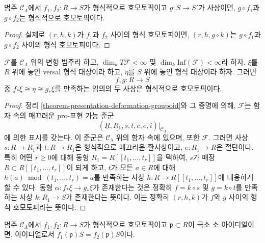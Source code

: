 \begin{lemma}
\label{lemma-composition-homotopic}
범주 $\widehat{\mathcal{C}}_\Lambda$에서 $f_1, f_2 : R \to S$가
형식적으로 호모토픽이고 $g : S \to S'$가 사상이면,
$g \circ f_1$과 $g \circ f_2$는 형식적으로 호모토픽이다.
\end{lemma}

\begin{proof}
실제로 $(r, h, k)$가 $f_1$과 $f_2$ 사이의 형식 호모토피이면,
$(r, h, g \circ k)$는 $g \circ f_1$과 $g \circ f_2$ 사이의
형식 호모토피이다.
\end{proof}

\begin{lemma}
\label{lemma-versal-unique-up-to-homotopy}
$\mathcal{F}$를 $\mathcal{C}_\Lambda$ 위의 변형 범주라 하고,
$\dim_k T\mathcal{F} < \infty$ 및
$\dim_k \text{Inf}(\mathcal{F}) < \infty$라 하자.
$\xi$를 $R$ 위에 놓인 versal 형식 대상이라 하고,
$\eta$를 $S$ 위에 놓인 형식 대상이라 하자. 그러면
$$
f, g : R \to S
$$
중 $f_*\xi \cong \eta \cong g_*\xi$를 만족하는 임의의 두 사상은
형식적으로 호모토픽이다.
\end{lemma}

\begin{proof}
정리 \ref{theorem-presentation-deformation-groupoid}와 그 증명에 의해,
$\mathcal{F}$는 함자 속의 매끄러운 pro-표현 가능 준군
$$
(\underline{R}, \underline{R_1}, s, t, c, e, i)|_{\mathcal{C}_\Lambda}
$$
에 의한 표시를 갖는다. 이 준군은 $\mathcal{C}_\lambda$ 위의 함자 속에 있으며,
또한 $\mathcal{F}$.
그러면 사상 $s : R \to R_1$과 $t : R \to R_1$은 형식적으로 매끄러운
환사상이고, $e : R_1 \to R$은 절단이다. 특히 어떤 $r \geq 0$에 대해
동형 $R_1 = R[[t_1, \ldots, t_r]]$을 택하여,
$s$가 매장 $R \subset R[[t_1, \ldots, t_r]]$이 되게 하고,
$t$가 모든 $a \in R$에 대해
$h(a) \bmod (t_1, \ldots, t_r) = a$를 만족하는 사상
$h : R \to R[[t_1, \ldots, t_r]]$에 대응하게 할 수 있다.
동형 $\alpha : f_*\xi \to g_*\xi$가 존재한다는 것은 정확히
$f = k \circ s$ 및 $g = k \circ t$를 만족하는 사상
$k : R_1 \to S$가 존재한다는 뜻이다. 이는 정확히 $(r, h, k)$가
$f$와 $g$ 사이의 형식 호모토피라는 뜻이다.
\end{proof}

\begin{lemma}
\label{lemma-homotopic-minimal-prime}
범주 $\widehat{\mathcal{C}}_\Lambda$에서 $f_1, f_2 : R \to S$가
형식적으로 호모토픽이고 $\mathfrak p \subset R$이 극소 소 아이디얼이면,
아이디얼로서 $f_1(\mathfrak p)S = f_2(\mathfrak p)S$이다.
\end{lemma}

